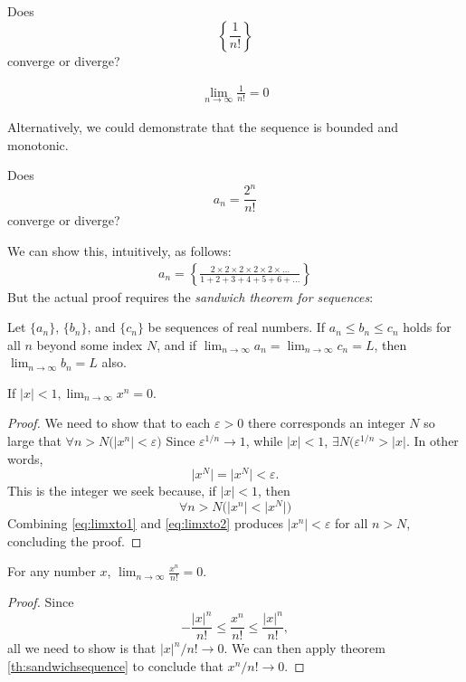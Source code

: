 \begin{ex}
  Does
  \[ \left\{ \frac{1}{n!} \right\} \]
  converge or diverge?
  \begin{sol}
      \begin{align*}
        \lim_{n \to \infty} \frac{1}{n!} = 0
      \end{align*}
  \end{sol}
  Alternatively, we could demonstrate that the sequence is bounded and monotonic.
\end{ex}
\begin{ex}
  Does
  \[ a_n = \frac{2^n}{n!} \]
  converge or diverge?
  \begin{sol}
    We can show this, intuitively, as follows:
    \begin{align*}
      a_n = \left\{
        \frac{2\times2\times2\times2\times2\times\ldots}{1+2+3+4+5+6+\ldots} \right\}
    \end{align*}
    But the actual proof requires the \emph{sandwich theorem for
    sequences}\cite[p.~536]{thomas}:
    \begin{theorem}\label{th:sandwichsequence}
      Let $\{a_n\}$, $\{b_n\}$, and $\{c_n\}$ be sequences of real numbers. If
      $a_n \leq b_n \leq c_n $ holds for all $n$ beyond some index $N$, and if
      $\lim_{n\to\infty} a_n = \lim_{n\to\infty} c_n = L$, then
      $\lim_{n\to\infty} b_n = L$ also.
    \end{theorem}
    \begin{theorem}\label{th:xninfty}
      If \(|x| < 1, \lim_{n \to \infty} x^n = 0\).
      \begin{proof}
        We need to show that to each $\varepsilon > 0$ there corresponds an
        integer $N$ so large that $\forall n > N \big( |x^n| < \varepsilon\big)$
        Since $\varepsilon^{1/n}\to 1$, while $|x|<1$, $\exists N \big(
        \varepsilon^{1/n} > |x|$. In other words,
        \begin{equation}\label{eq:limxto1}
          \Big|x^N\Big| = \Big|x^N\Big| < \varepsilon.
        \end{equation}
        This is the integer we seek because, if $|x|< 1$, then
        \begin{equation}\label{eq:limxto2}
          \forall n > N \bigg( \Big|x^n\Big| < \Big|x^N\Big|\bigg)
        \end{equation}
        Combining \eqref{eq:limxto1} and \eqref{eq:limxto2} produces
        $|x^n|<\varepsilon$ for all $n > N$, concluding the
        proof.\cite[p.~AP-21]{thomas}
      \end{proof}
    \end{theorem}
    \begin{theorem}\label{th:limxnnf}
      For any number $x$, $\lim_{n\to\infty} \frac{x^n}{n!} = 0$.
      \begin{proof}
      Since
      \[ - \frac{|x|^n}{n!} \leq \frac{x^n}{n!} \leq \frac{|x|^n}{n!},\]
      all we need to show is that $|x|^n/n! \to 0$. We can then apply theorem
      \ref{th:sandwichsequence} to conclude that $x^n/n! \to 0$.


\end{proof}
\end{theorem}
\end{sol}
\end{ex}
